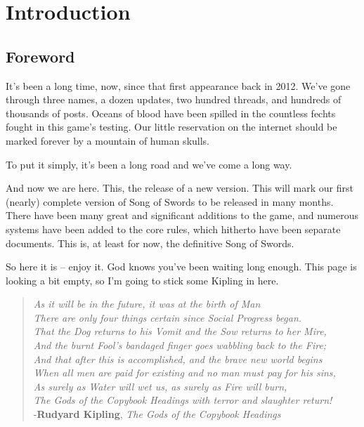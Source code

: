 \documentclass[oneside,11pt,english]{book}
\begin{document}
\chapter{Introduction}\label{ch:intro}
	\newlength{\oldintextsep}
	\setlength{\oldintextsep}{\intextsep}
\newpage
\section*{Foreword}
It’s been a long time, now, since that first appearance back in 2012. We’ve gone through three names, a dozen updates, two hundred threads, and hundreds of thousands of posts. Oceans of blood have been spilled in the countless fechts fought in this game’s testing. Our little reservation on the internet should be marked forever by a mountain of human skulls.

To put it simply, it’s been a long road and we’ve come a long way.

\noindent And now we are here. This, the release of a new version. This will mark our first (nearly) complete 
version of Song of Swords to be released in many months. There have been many great and significant 
additions to the game, and numerous systems have been added to the core rules, which hitherto have been 
separate documents. This is, at least for now, the definitive Song of Swords. 

So here it is -- enjoy it. God knows you’ve been waiting long enough. This page is looking a bit empty, so 
I’m going to stick some Kipling in here. 
\vspace{0.8 cm}
{\large
\begin{verse}
\emph{As it will be in the future, it was at the birth of Man\\
There are only four things certain since Social Progress began. \\
That the Dog returns to his Vomit and the Sow returns to her Mire,\\
And the burnt Fool's bandaged finger goes wabbling back to the Fire; \\}
\vspace{0.4 cm}
\emph{And that after this is accomplished, and the brave new world begins \\ 
When all men are paid for existing and no man must pay for his sins, \\
As surely as Water will wet us, as surely as Fire will burn, \\ 
The Gods of the Copybook Headings with terror and slaughter return! \\}
\vspace{0.3 cm}
\hfill-\textbf{Rudyard Kipling}, \textit{The Gods of the Copybook Headings} 
\end{verse}}
	\newpage
\end{document}
